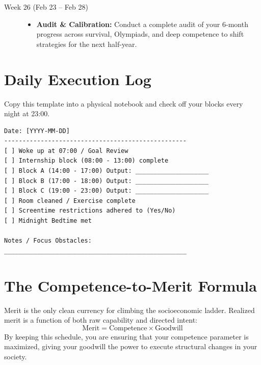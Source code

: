 \documentclass[11pt,a4paper]{article}
\begin{document}
\begin{description}
    \item[Week 26 (Feb 23 -- Feb 28)] \hfill
    \begin{itemize}
        \item \textbf{Audit \& Calibration:} Conduct a complete audit of your 6-month progress across survival, Olympiads, and deep competence to shift strategies for the next half-year.
    \end{itemize}
\end{description}

\newpage
\section{Daily Execution Log}
Copy this template into a physical notebook and check off your blocks every night at 23:00.
\begin{verbatim}
Date: [YYYY-MM-DD]
--------------------------------------------------
[ ] Woke up at 07:00 / Goal Review
[ ] Internship block (08:00 - 13:00) complete
[ ] Block A (14:00 - 17:00) Output: ____________________
[ ] Block B (17:00 - 18:00) Output: ____________________
[ ] Block C (19:00 - 23:00) Output: ____________________
[ ] Room cleaned / Exercise complete
[ ] Screentime restrictions adhered to (Yes/No)
[ ] Midnight Bedtime met

Notes / Focus Obstacles:
__________________________________________________
\end{verbatim}

\section{The Competence-to-Merit Formula}
Merit is the only clean currency for climbing the socioeconomic ladder. Realized merit is a function of both raw capability and directed intent:
\begin{equation}
\text{Merit} = \text{Competence} \times \text{Goodwill}
\end{equation}
By keeping this schedule, you are ensuring that your competence parameter is maximized, giving your goodwill the power to execute structural changes in your society.
\end{document}
